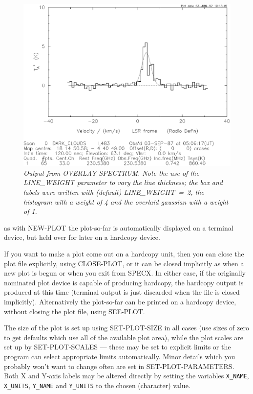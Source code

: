 \documentclass[11pt,twoside]{report}
\begin{document}
\begin{figure}[htbp]
\begin{center}
\includegraphics[scale=0.65]{overlay.ps}
\protect\parbox{5.5in}
{\caption[PLOT]
{\sl
Output from OVERLAY-SPECTRUM. Note the use of the LINE\_WEIGHT
parameter to vary the line thickness; the box and labels were written
with (default) LINE\_WEIGHT~=~2, the histogram with a weight of 4
and the overlaid gaussian with a weight of 1.
\label{PLOT}
}
}
\end{center}
\end{figure}
as with NEW-PLOT the plot-so-far is automatically displayed on a
terminal device, but held over for later on a hardcopy device. 

If you want to make a plot come out on a hardcopy unit, then
you can close the plot file explicitly, using CLOSE-PLOT, or it can be closed
implicitly as when a new plot is begun or when you exit from SPECX. In either
case, if the originally nominated plot device is capable of producing hardcopy,
the hardcopy output is produced at this time (terminal output is just discarded
when the file is closed implicitly). Alternatively the plot-so-far can be
printed on a hardcopy device, without closing the plot file, using SEE-PLOT. 

The size of the plot
is set up using SET-PLOT-SIZE in all cases (use sizes of zero to get 
defaults which use all of the available plot area), while the plot scales
are set up by SET-PLOT-SCALES --- these may be set to explicit limits or the
program can select appropriate limits automatically. Minor details which you
probably won't want to change often are set in SET-PLOT-PARAMETERS.
Both X and Y-axis labels may be altered directly by setting the variables
\verb+X_NAME+, \verb+X_UNITS+, \verb+Y_NAME+ and \verb+Y_UNITS+ to the chosen
(character) value. 
\end{document}

